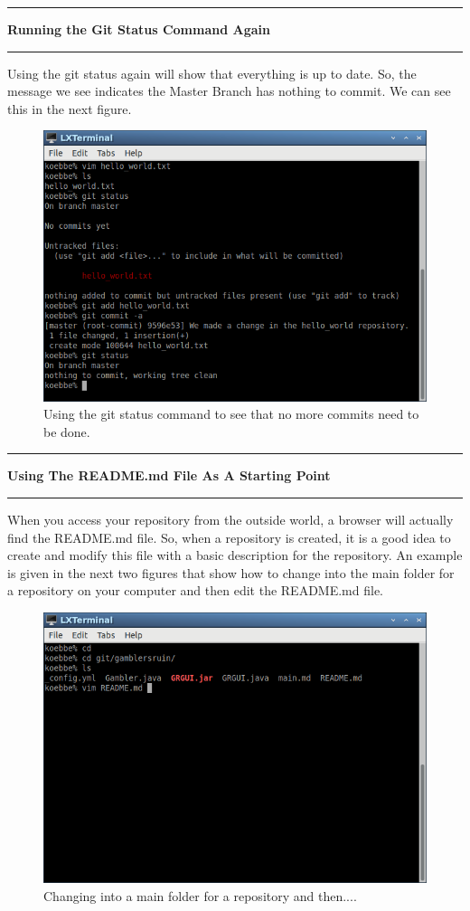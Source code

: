 \documentclass[10pt,fleqn]{article}
\begin{document}
\vskip0.1in\hrule\vskip0.1in\noindent
{\bf Running the Git Status Command Again} 
\vskip0.1in\hrule\vskip0.1in\noindent
Using the git status again will show that everything is up to date. So, the
message we see indicates the Master Branch has nothing to commit. We can see
this in the next figure.
\vfill
\begin{figure}[h]
\centering
\includegraphics[width=5.0in]{../images/git_10.png}
\caption{Using the git status command to see that no more commits need to be
done.}
\end{figure}
\eject
\vskip0.1in\hrule\vskip0.1in\noindent
{\bf Using The README.md File As A Starting Point} 
\vskip0.1in\hrule\vskip0.1in\noindent
When you access your repository from the outside world, a browser will actually
find the README.md file. So, when a repository is created, it is a good idea
to create and modify this file with a basic description for the repository. An
example is given in the next two figures that show how to change into the main
folder for a repository on your computer and then edit the README.md file.
\vfill
\begin{figure}[h]
\centering
\includegraphics[width=5.0in]{../images/git_11.png}
\caption{Changing into a main folder for a repository and then....}
\end{figure}
\end{document}
